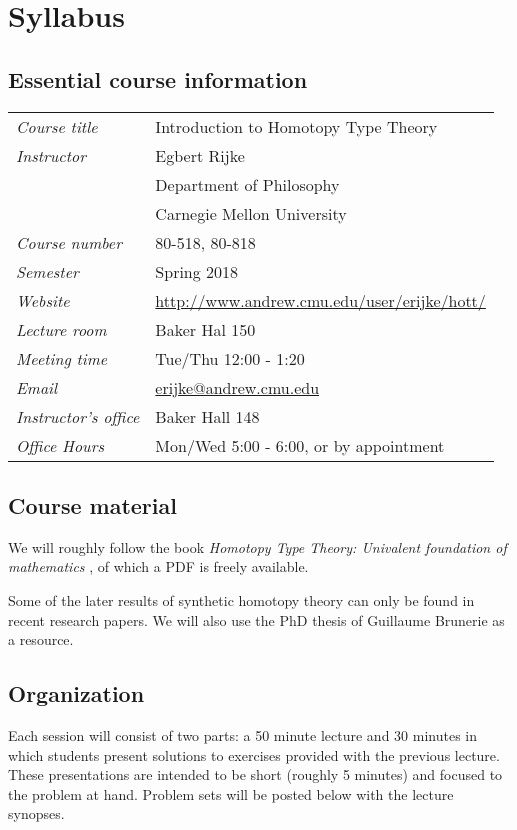 \chapter{Syllabus}

\section{Essential course information}
\begin{center}
\begin{tabular}{ll}
\emph{Course title} & Introduction to Homotopy Type Theory \\
\emph{Instructor} & Egbert Rijke \\
& Department of Philosophy \\
& Carnegie Mellon University \\
\emph{Course number} & 80-518, 80-818 \\
\emph{Semester} & Spring 2018 \\
\emph{Website} & \url{http://www.andrew.cmu.edu/user/erijke/hott/} \\
\emph{Lecture room} & Baker Hal 150 \\
\emph{Meeting time} & Tue/Thu 12:00 - 1:20 \\
\emph{Email} & \href{mailto:erijke@andrew.cmu.edu}{erijke@andrew.cmu.edu} \\
\emph{Instructor's office} & Baker Hall 148 \\
\emph{Office Hours} & Mon/Wed 5:00 - 6:00, or by appointment
\end{tabular}
\end{center}

\section{Course material}

We will roughly follow the book \emph{Homotopy Type Theory: Univalent foundation of mathematics} \cite{hottbook}, of which a PDF is freely available.

Some of the later results of synthetic homotopy theory can only be found in recent research papers. We will also use the PhD thesis of Guillaume Brunerie \cite{BruneriePhD} as a resource.

\section{Organization}

Each session will consist of two parts: a 50 minute lecture and 30 minutes in which students present solutions to exercises provided with the previous lecture. These presentations are intended to be short (roughly 5 minutes) and focused to the problem at hand. Problem sets will be posted below with the lecture synopses.

